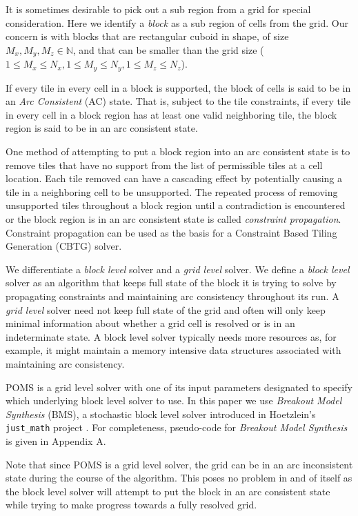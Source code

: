 It is sometimes desirable to pick out a sub region from a grid for special consideration.
Here we identify a \textit{block} as a sub region of cells from the grid.
Our concern is with blocks that are rectangular cuboid in shape,
of size $M_x, M_y, M_z \in \mathbb{N}$,
and that can be smaller than the grid size ($1 \le M_x \le N_x, 1 \le M_y \le N_y, 1 \le M_z \le N_z$).

If every tile in every cell in a block is supported, the block of cells is said to be in an \textit{Arc Consistent} (AC) state.
That is, subject to the tile constraints, if every tile in every cell in a block region has at least one valid neighboring tile, the block region
is said to be in an arc consistent state.

One method of attempting to put a block region into an arc consistent state is to remove tiles that have no support from the list of permissible
tiles at a cell location.
Each tile removed can have a cascading effect by potentially causing a tile in a neighboring cell to be unsupported.
The repeated process of removing unsupported tiles throughout a block region until a contradiction is encountered or the block region
is in an arc consistent state is called \textit{constraint propagation}.
Constraint propagation
can be used as the basis for a Constraint Based Tiling Generation (CBTG) solver.

We differentiate a \textit{block level} solver and a \textit{grid level} solver.
We define a \textit{block level} solver as an algorithm that
keeps full state of the block it is trying to solve by propagating constraints and maintaining arc consistency
throughout its run.
A \textit{grid level} solver need not keep full state of the grid and often will only keep minimal information about whether
a grid cell is resolved or is in an indeterminate state.
A block level solver typically needs more resources as, for example,
it might maintain a memory intensive data structures associated
with maintaining arc consistency.

POMS is a grid level solver with one of its input parameters designated to specify
which underlying block level solver to use.
In this paper we use \textit{Breakout Model Synthesis} (BMS), a stochastic block level solver
introduced in Hoetzlein's \texttt{just\_math} project  \cite{Hoetzlein_2023}.
For completeness, pseudo-code for \textit{Breakout Model Synthesis} is given in Appendix A.

Note that since  POMS is a grid level solver, the grid can be in an arc inconsistent
state during the course of the algorithm.
This poses no problem in and of itself as the block level solver will attempt to put the block
in an arc consistent state while trying to make progress towards a fully resolved
grid.



